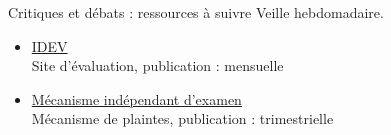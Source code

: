\documentclass[aspectratio=169,11pt]{beamer}
\begin{document}
\begin{frame}{Critiques et débats : ressources à suivre}
\small
Veille hebdomadaire.
\begin{itemize}
\item \href{https://idev.afdb.org}{IDEV}\\{\footnotesize Site d'évaluation, publication : mensuelle}
\item \href{https://www.afdb.org/en/independent-review-mechanism}{Mécanisme indépendant d'examen}\\{\footnotesize Mécanisme de plaintes, publication : trimestrielle}
\end{itemize}
\end{frame}
\end{document}
